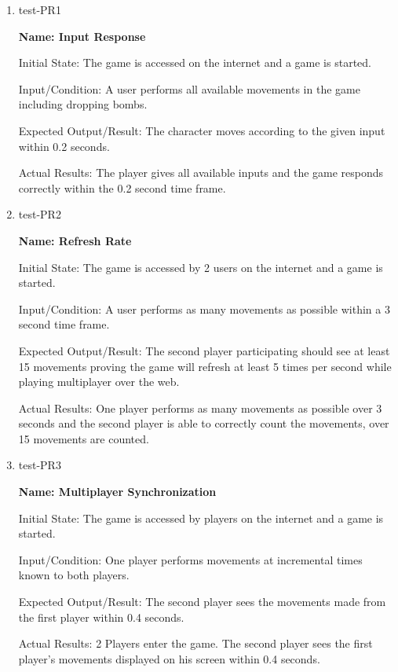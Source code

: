 \documentclass[12pt, titlepage]{article}
\begin{document}
\begin{enumerate}

\item{test-PR1\\}

\textbf{Name: Input Response}
					
Initial State: The game is accessed on the internet and a game is started.
					
Input/Condition: A user performs all available movements in the game including dropping bombs.
					
Expected Output/Result: The character moves according to the given input within 0.2 seconds. 
					
Actual Results: The player gives all available inputs and the game responds correctly within the 0.2 second time frame.  

\item{test-PR2\\}

\textbf{Name: Refresh Rate}
					
Initial State: The game is accessed by 2 users on the internet and a game is started. 
					
Input/Condition: A user performs as many movements as possible within a 3 second time frame. 
					
Expected Output/Result: The second player participating should see at least 15 movements proving the game will refresh at least 5 times per second while playing multiplayer over the web. 
					
Actual Results: One player performs as many movements as possible over 3 seconds and the second player is able to correctly count the movements, over 15 movements are counted. 

\item{test-PR3\\}

\textbf{Name: Multiplayer Synchronization}
					
Initial State: The game is accessed by players on the internet and a game is started.
					
Input/Condition: One player performs movements at incremental times known to both players. 
					
Expected Output/Result: The second player sees the movements made from the first player within 0.4 seconds. 
					
Actual Results: 2 Players enter the game. The second player sees the first player's movements displayed on his screen within 0.4 seconds. 

\end{enumerate}
\end{document}
